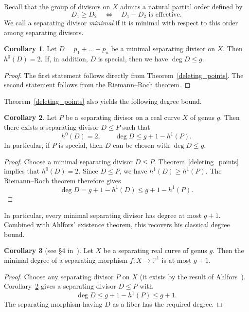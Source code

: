 \documentclass[x11names,oneside,11pt]{amsart}
\theoremstyle{definition}
\newtheorem{corollary}{Corollary}
\theoremstyle{remark}
\newcommand{\PP}{\mathbb{P}}
\begin{document}
  Recall that the group of divisors on $X$ admits a natural
  partial order defined by
  \[
      D_1\geqslant D_2
      \quad\Longleftrightarrow\quad
      D_1-D_2 \text{ is effective}.
  \]
  We call a separating divisor \emph{minimal} if it is minimal with respect to this order among separating divisors.

   \begin{corollary}
    Let $D = p_1 + \ldots + p_n$ be a minimal separating divisor on $X$. Then $h^0(D) = 2$. If, in addition, $D$ is special, then we have $\deg{D} \leqslant g$.
  \end{corollary}
  \begin{proof}
    The first statement follows directly from Theorem~\ref{deleting_points}. The second statement follows from the Riemann--Roch theorem. 
  \end{proof}

  Theorem~\ref{deleting_points} also yields the following degree bound.

  \begin{corollary}\label{ahlfors_refinement}
  Let $P$ be a separating divisor on a real curve $X$ of genus $g$.
  Then there exists a separating divisor $D\leqslant P$ such that
  \[
      h^0(D)=2,
      \qquad
      \deg D\leqslant g+1-h^1(P).
  \]
  In particular, if $P$ is special, then $D$ can be chosen
  with $\deg D\leqslant g$.
  \end{corollary}

  \begin{proof}
  Choose a minimal separating divisor $D\leqslant P$. Theorem~\ref{deleting_points} implies that $h^0(D)=2$. Since $D\leqslant P$, we have $h^1(D)\geqslant h^1(P)$.
  The Riemann--Roch theorem therefore gives
  \[
      \deg D=g+1-h^1(D)\leqslant g+1-h^1(P).
  \]
  \end{proof}

  In particular, every minimal separating divisor has degree
  at most $g+1$. Combined with Ahlfors' existence theorem,
  this recovers his classical degree bound.

  \begin{corollary}[see \S4 in~\cite{ahlfors_open_1950}]
  \label{ahlfors_g+1}
  Let $X$ be a separating real curve of genus $g$.
  Then the minimal degree of a separating morphism
  $f\colon X\to\PP^1$ is at most $g+1$.
  \end{corollary}

  \begin{proof}
  Choose any separating divisor $P$ on $X$ (it exists by the result of Ahlfors~\cite[\S 4.2, pp.~124--126]{ahlfors_open_1950}). Corollary~\ref{ahlfors_refinement} gives a separating divisor
  $D\leqslant P$ with
  \[
      \deg D\leqslant g+1-h^1(P)\leqslant g+1.
  \]
  The separating morphism having $D$ as a fiber has the
  required degree.
  \end{proof}
\end{document}
